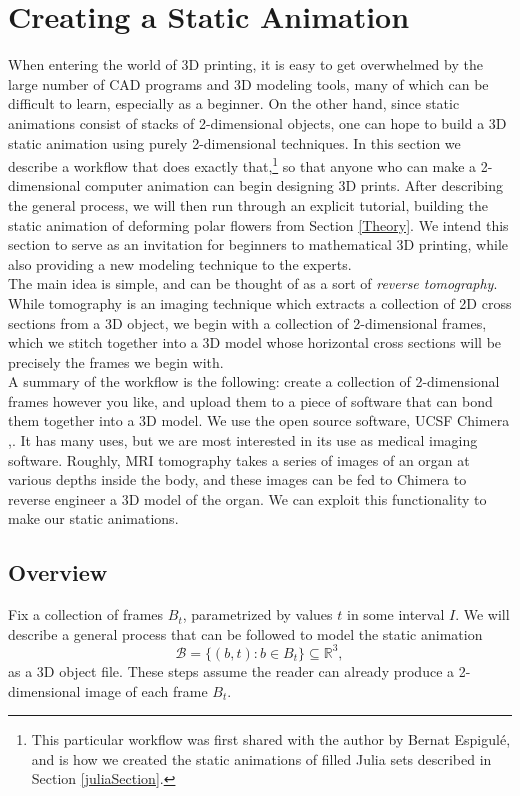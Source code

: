 \documentclass[12 pt]{article}
\newcommand{\bR}{\mathbb{R}}
\newcommand{\cB}{\mathcal{B}}
\begin{document}
\section{Creating a Static Animation}\label{How?}
When entering the world of 3D printing, it is easy to get overwhelmed by the large number of CAD programs and 3D modeling tools, many of which can be difficult to learn, especially as a beginner.  On the other hand, since static animations consist of stacks of 2-dimensional objects, one can hope to build a 3D static animation using purely 2-dimensional techniques.  In this section we describe a workflow that does exactly that,\footnote{This particular workflow was first shared with the author by Bernat Espigul\'e, and is how we created the static animations of filled Julia sets described in Section \ref{juliaSection}.} so that anyone who can make a 2-dimensional computer animation can begin designing 3D prints.  After describing the general process, we will then run through an explicit tutorial, building the static animation of deforming polar flowers from Section \ref{Theory}.  We intend this section to serve as an invitation for beginners to mathematical 3D printing, while also providing a new modeling technique to the experts.\\

The main idea is simple, and can be thought of as a sort of \textit{reverse tomography}.  While tomography is an imaging technique which extracts a collection of 2D cross sections from a 3D object, we begin with a collection of 2-dimensional frames, which we stitch together into a 3D model whose horizontal cross sections will be precisely the frames we begin with.\\

A summary of the workflow is the following: create a collection of 2-dimensional frames however you like, and upload them to a piece of software that can bond them together into a 3D model.  We use the open source software, UCSF Chimera \cite{chimera},\cite{chimeraSoftware}.  It has many uses, but we are most interested in its use as medical imaging software.  Roughly, MRI tomography takes a series of images of an organ at various depths inside the body, and these images can be fed to Chimera to reverse engineer a 3D model of the organ.  We can exploit this functionality to make our static animations.

\subsection{Overview}
Fix a collection of frames $B_t$, parametrized by values $t$ in some interval $I$.  We will describe a general process that can be followed to model the static animation
\[\cB = \{(b,t):b\in B_t\}\subseteq\bR^3,\]
as a 3D object file.  These steps assume the reader can already produce a 2-dimensional image of each frame $B_t$.
\end{document}
